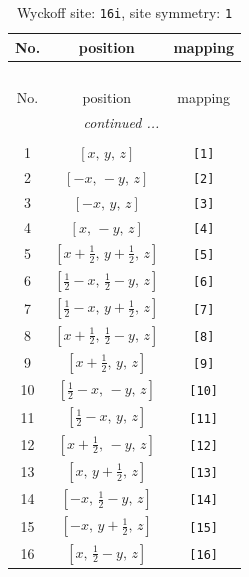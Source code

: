 \documentclass[fleqn,8pt]{jsarticle}
\begin{document}
\begin{longtable}{ccc}
\caption{Wyckoff site: {\tt 16i}, site symmetry: {\tt 1}}
 \\
 \hline \hline
No. & position & mapping \\ \hline \endfirsthead

\multicolumn{2}{l}{\tablename\ \thetable{}} \\
 \hline \hline
No. & position & mapping \\ \hline \endhead

 \hline \hline
\multicolumn{2}{r}{\footnotesize\it continued ...} \\ \endfoot

 \hline \hline
\multicolumn{2}{r}{} \\ \endlastfoot

1 & $\left[ x,\, y,\, z \right]$ & {\tt [1]} \\ \hline
2 & $\left[ - x,\, - y,\, z \right]$ & {\tt [2]} \\ \hline
3 & $\left[ - x,\, y,\, z \right]$ & {\tt [3]} \\ \hline
4 & $\left[ x,\, - y,\, z \right]$ & {\tt [4]} \\ \hline
5 & $\left[ x + \frac{1}{2},\, y + \frac{1}{2},\, z \right]$ & {\tt [5]} \\ \hline
6 & $\left[ \frac{1}{2} - x,\, \frac{1}{2} - y,\, z \right]$ & {\tt [6]} \\ \hline
7 & $\left[ \frac{1}{2} - x,\, y + \frac{1}{2},\, z \right]$ & {\tt [7]} \\ \hline
8 & $\left[ x + \frac{1}{2},\, \frac{1}{2} - y,\, z \right]$ & {\tt [8]} \\ \hline
9 & $\left[ x + \frac{1}{2},\, y,\, z \right]$ & {\tt [9]} \\ \hline
10 & $\left[ \frac{1}{2} - x,\, - y,\, z \right]$ & {\tt [10]} \\ \hline
11 & $\left[ \frac{1}{2} - x,\, y,\, z \right]$ & {\tt [11]} \\ \hline
12 & $\left[ x + \frac{1}{2},\, - y,\, z \right]$ & {\tt [12]} \\ \hline
13 & $\left[ x,\, y + \frac{1}{2},\, z \right]$ & {\tt [13]} \\ \hline
14 & $\left[ - x,\, \frac{1}{2} - y,\, z \right]$ & {\tt [14]} \\ \hline
15 & $\left[ - x,\, y + \frac{1}{2},\, z \right]$ & {\tt [15]} \\ \hline
16 & $\left[ x,\, \frac{1}{2} - y,\, z \right]$ & {\tt [16]} \\
\end{longtable}
\end{document}
